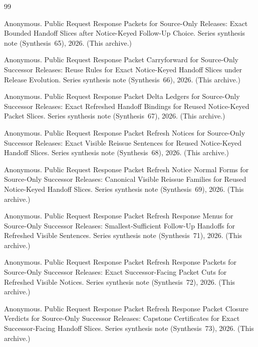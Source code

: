 \documentclass[11pt]{article}
\begin{document}
\begin{thebibliography}{99}\small

Anonymous.
\newblock Public Request Response Packets for Source-Only Releases: Exact Bounded Handoff Slices after Notice-Keyed Follow-Up Choice.
\newblock Series synthesis note (Synthesis~65), 2026. (This archive.)

Anonymous.
\newblock Public Request Response Packet Carryforward for Source-Only Successor Releases: Reuse Rules for Exact Notice-Keyed Handoff Slices under Release Evolution.
\newblock Series synthesis note (Synthesis~66), 2026. (This archive.)

Anonymous.
\newblock Public Request Response Packet Delta Ledgers for Source-Only Successor Releases: Exact Refreshed Handoff Bindings for Reused Notice-Keyed Packet Slices.
\newblock Series synthesis note (Synthesis~67), 2026. (This archive.)

Anonymous.
\newblock Public Request Response Packet Refresh Notices for Source-Only Successor Releases: Exact Visible Reissue Sentences for Reused Notice-Keyed Handoff Slices.
\newblock Series synthesis note (Synthesis~68), 2026. (This archive.)

Anonymous.
\newblock Public Request Response Packet Refresh Notice Normal Forms for Source-Only Successor Releases: Canonical Visible Reissue Families for Reused Notice-Keyed Handoff Slices.
\newblock Series synthesis note (Synthesis~69), 2026. (This archive.)

Anonymous.
\newblock Public Request Response Packet Refresh Response Menus for Source-Only Successor Releases: Smallest-Sufficient Follow-Up Handoffs for Refreshed Visible Sentences.
\newblock Series synthesis note (Synthesis~71), 2026. (This archive.)

Anonymous.
\newblock Public Request Response Packet Refresh Response Packets for Source-Only Successor Releases: Exact Successor-Facing Packet Cuts for Refreshed Visible Notices.
\newblock Series synthesis note (Synthesis~72), 2026. (This archive.)

Anonymous.
\newblock Public Request Response Packet Refresh Response Packet Closure Verdicts for Source-Only Successor Releases: Capstone Certificates for Exact Successor-Facing Handoff Slices.
\newblock Series synthesis note (Synthesis~73), 2026. (This archive.)


\end{thebibliography}
\end{document}
